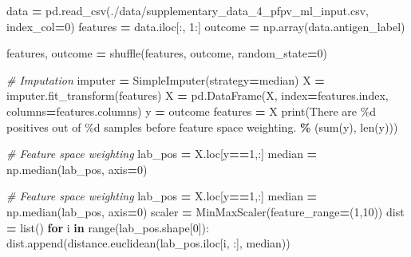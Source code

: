 \documentclass[
  11pt,
  oneside]{book}
\newenvironment{Shaded}{\begin{snugshade}}{\end{snugshade}}
\newcommand{\BuiltInTok}[1]{#1}
\newcommand{\CommentTok}[1]{\textcolor[rgb]{0.56,0.35,0.01}{\textit{#1}}}
\newcommand{\ControlFlowTok}[1]{\textcolor[rgb]{0.13,0.29,0.53}{\textbf{#1}}}
\newcommand{\DecValTok}[1]{\textcolor[rgb]{0.00,0.00,0.81}{#1}}
\newcommand{\KeywordTok}[1]{\textcolor[rgb]{0.13,0.29,0.53}{\textbf{#1}}}
\newcommand{\NormalTok}[1]{#1}
\newcommand{\OperatorTok}[1]{\textcolor[rgb]{0.81,0.36,0.00}{\textbf{#1}}}
\newcommand{\SpecialCharTok}[1]{\textcolor[rgb]{0.00,0.00,0.00}{#1}}
\newcommand{\StringTok}[1]{\textcolor[rgb]{0.31,0.60,0.02}{#1}}
\begin{document}
\begin{Shaded}
\begin{Highlighting}[]
\NormalTok{data }\OperatorTok{=}\NormalTok{ pd.read\_csv(}\StringTok{\textquotesingle{}./data/supplementary\_data\_4\_pfpv\_ml\_input.csv\textquotesingle{}}\NormalTok{, index\_col}\OperatorTok{=}\DecValTok{0}\NormalTok{)}
\NormalTok{features }\OperatorTok{=}\NormalTok{ data.iloc[:, }\DecValTok{1}\NormalTok{:]}
\NormalTok{outcome }\OperatorTok{=}\NormalTok{ np.array(data.antigen\_label)}

\NormalTok{features, outcome }\OperatorTok{=}\NormalTok{ shuffle(features, outcome, random\_state}\OperatorTok{=}\DecValTok{0}\NormalTok{)}

\CommentTok{\# Imputation}
\NormalTok{imputer }\OperatorTok{=}\NormalTok{ SimpleImputer(strategy}\OperatorTok{=}\StringTok{\textquotesingle{}median\textquotesingle{}}\NormalTok{)}
\NormalTok{X }\OperatorTok{=}\NormalTok{ imputer.fit\_transform(features)}
\NormalTok{X }\OperatorTok{=}\NormalTok{ pd.DataFrame(X, index}\OperatorTok{=}\NormalTok{features.index, columns}\OperatorTok{=}\NormalTok{features.columns)}
\NormalTok{y }\OperatorTok{=}\NormalTok{ outcome}
\NormalTok{features }\OperatorTok{=}\NormalTok{ X}
\BuiltInTok{print}\NormalTok{(}\StringTok{\textquotesingle{}There are }\SpecialCharTok{\%d}\StringTok{ positives out of }\SpecialCharTok{\%d}\StringTok{ samples before feature space weighting.\textquotesingle{}} \OperatorTok{\%}\NormalTok{ (}\BuiltInTok{sum}\NormalTok{(y), }\BuiltInTok{len}\NormalTok{(y)))}

\CommentTok{\# Feature space weighting}
\NormalTok{lab\_pos }\OperatorTok{=}\NormalTok{ X.loc[y}\OperatorTok{==}\DecValTok{1}\NormalTok{,:]}
\NormalTok{median }\OperatorTok{=}\NormalTok{ np.median(lab\_pos, axis}\OperatorTok{=}\DecValTok{0}\NormalTok{)}

\CommentTok{\# Feature space weighting}
\NormalTok{lab\_pos }\OperatorTok{=}\NormalTok{ X.loc[y}\OperatorTok{==}\DecValTok{1}\NormalTok{,:]}
\NormalTok{median }\OperatorTok{=}\NormalTok{ np.median(lab\_pos, axis}\OperatorTok{=}\DecValTok{0}\NormalTok{)}
\NormalTok{scaler }\OperatorTok{=}\NormalTok{ MinMaxScaler(feature\_range}\OperatorTok{=}\NormalTok{(}\DecValTok{1}\NormalTok{,}\DecValTok{10}\NormalTok{))}
\NormalTok{dist }\OperatorTok{=} \BuiltInTok{list}\NormalTok{()}
\ControlFlowTok{for}\NormalTok{ i }\KeywordTok{in} \BuiltInTok{range}\NormalTok{(lab\_pos.shape[}\DecValTok{0}\NormalTok{]):}
\NormalTok{    dist.append(distance.euclidean(lab\_pos.iloc[i, :], median))}
    

\end{Highlighting}
\end{Shaded}
\end{document}

